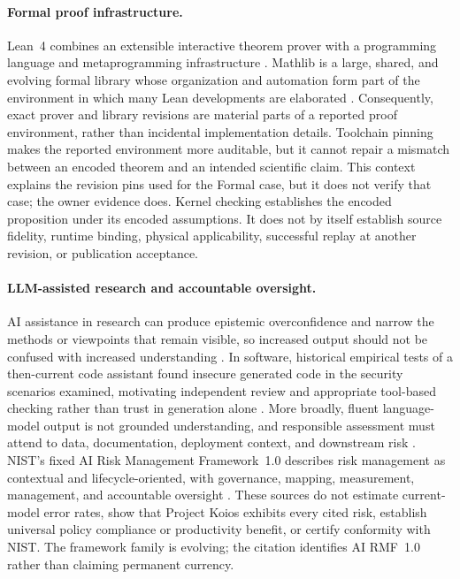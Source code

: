 \documentclass[11pt]{article}
\newcommand{\projectkoios}{Project Koios}
\begin{document}
\paragraph{Formal proof infrastructure.}
Lean~4 combines an extensible interactive theorem prover with a programming
language and metaprogramming infrastructure
\citep{deMouraUllrich2021Lean4}. Mathlib is a large, shared, and evolving formal
library whose organization and automation form part of the environment in which
many Lean developments are elaborated
\citep{MathlibCommunity2020LeanLibrary}. Consequently, exact prover and library
revisions are material parts of a reported proof environment, rather than
incidental implementation details. Toolchain pinning makes the reported
environment more auditable, but it cannot repair a mismatch between an encoded
theorem and an intended scientific claim. This context explains the revision
pins used for the Formal case, but it does not verify that case; the owner
evidence does. Kernel checking establishes the encoded proposition under its encoded
assumptions. It does not by itself establish source fidelity, runtime binding,
physical applicability, successful replay at another revision, or publication
acceptance.

\paragraph{LLM-assisted research and accountable oversight.}
AI assistance in research can produce epistemic overconfidence and narrow the
methods or viewpoints that remain visible, so increased output should not be
confused with increased understanding
\citep{MesseriCrockett2024IllusionsUnderstanding}. In software, historical
empirical tests of a then-current code assistant found insecure generated code
in the security scenarios examined, motivating independent review and
appropriate tool-based checking rather than trust in generation alone
\citep{PearceEtAl2022AsleepKeyboard}. More broadly, fluent language-model output
is not grounded understanding, and responsible assessment must attend to data,
documentation, deployment context, and downstream risk
\citep{BenderEtAl2021StochasticParrots}. NIST's fixed AI Risk Management
Framework~1.0 describes risk management as contextual and lifecycle-oriented,
with governance, mapping, measurement, management, and accountable oversight
\citep{Tabassi2023AIRMF}. These sources do not estimate current-model error
rates, show that \projectkoios{} exhibits every cited risk, establish universal
policy compliance or productivity benefit, or certify conformity with NIST.
The framework family is evolving; the citation identifies AI RMF~1.0 rather
than claiming permanent currency.
\end{document}
